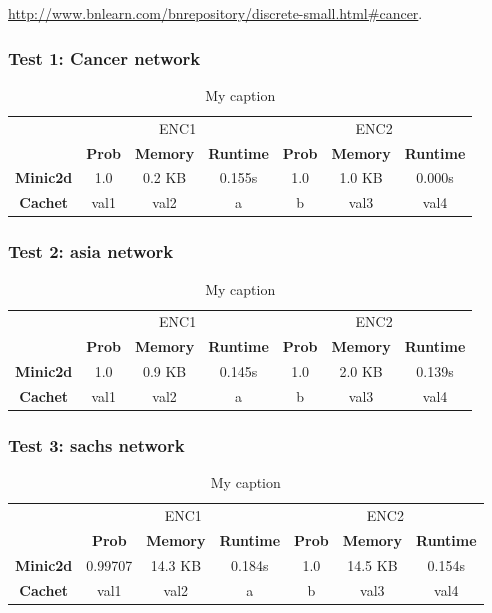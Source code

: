 \documentclass[a4paper,10pt]{report}
\begin{document}
\url{http://www.bnlearn.com/bnrepository/discrete-small.html#cancer}.

\subsubsection{Test 1: Cancer network}
\begin{table}[H]
\centering
\caption{My caption}
\label{my-label}
\begin{tabular}{c|c|c|c|c|c|c|}
\cline{2-7}
        & \multicolumn{3}{c|}{ENC1} & \multicolumn{3}{c|}{ENC2} \\ \cline{2-7} 
  & \textbf{Prob}  & \textbf{Memory}  & \textbf{Runtime} & \textbf{Prob}  & \textbf{Memory}  & \textbf{Runtime} \\ \cline{1-7} 
  \textbf{Minic2d} & 1.0  & 0.2 KB    & 0.155s   & 1.0    & 1.0 KB    & 0.000s \\
  \hline
\textbf{Cachet}  & val1  & val2    & a       & b     & val3    & val4    \\ \cline{1-7} 
\end{tabular}
\end{table}

\subsubsection{Test 2: asia network}
\begin{table}[H]
\centering
\caption{My caption}
\label{my-label}
\begin{tabular}{c|c|c|c|c|c|c|}
\cline{2-7}
        & \multicolumn{3}{c|}{ENC1} & \multicolumn{3}{c|}{ENC2} \\ \cline{2-7} 
  & \textbf{Prob}  & \textbf{Memory}  & \textbf{Runtime} & \textbf{Prob}  & \textbf{Memory}  & \textbf{Runtime} \\ \cline{1-7} 
  \textbf{Minic2d} & 1.0  & 0.9 KB    & 0.145s   & 1.0    & 2.0 KB    & 	 0.139s \\
  \hline
\textbf{Cachet}  & val1  & val2    & a       & b     & val3    & val4    \\ \cline{1-7} 
\end{tabular}
\end{table}

\subsubsection{Test 3: sachs network}
\begin{table}[H]
\centering
\caption{My caption}
\label{my-label}
\begin{tabular}{c|c|c|c|c|c|c|}
\cline{2-7}
        & \multicolumn{3}{c|}{ENC1} & \multicolumn{3}{c|}{ENC2} \\ \cline{2-7} 
  & \textbf{Prob}  & \textbf{Memory}  & \textbf{Runtime} & \textbf{Prob}  & \textbf{Memory}  & \textbf{Runtime} \\ \cline{1-7} 
  \textbf{Minic2d} & 0.99707  & 14.3 KB    & 0.184s   & 1.0    & 14.5 KB   & 	0.154s \\
  \hline
\textbf{Cachet}  & val1  & val2    & a       & b     & val3    & val4    \\ \cline{1-7} 
\end{tabular}
\end{table}
\end{document}

